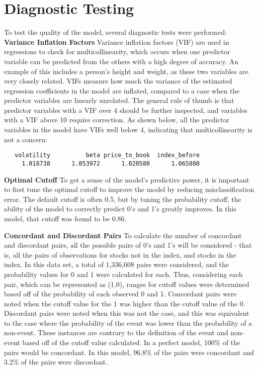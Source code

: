 \documentclass[12pt,twoside]{reedthesis}
\theoremstyle{definition}
\theoremstyle{definition}
\theoremstyle{definition}
\theoremstyle{remark}
\begin{document}
\section{Diagnostic Testing}\label{diagnostic-testing}

To test the quality of the model, several diagnostic tests were
performed: \hfill\break
\textbf{Variance Inflation Factors} \hfill\break
Variance inflation factors (VIF) are used in regressions to check for
multicollinearity, which occurs when one predictor variable can be
predicted from the others with a high degree of accuracy. An example of
this includes a person's height and weight, as these two variables are
very closely related. VIFs measure how much the variance of the
estimated regression coefficients in the model are inflated, compared to
a case when the predictor variables are linearly unrelated. The general
rule of thumb is that predictor variables with a VIF over 4 should be
further inspected, and variables with a VIF above 10 require correction.
As shown below, all the predictor variables in the model have VIFs well
below 4, indicating that multicollinearity is not a concern:
\begin{verbatim}
   volatility          beta price_to_book  index_before 
     1.018738      1.053972      1.020580      1.065880 
\end{verbatim}
\hfill\break
\textbf{Optimal Cutoff} \hfill\break
To get a sense of the model's predictive power, it is important to first
tune the optimal cutoff to improve the model by reducing
misclassification error. The default cutoff is often 0.5, but by tuning
the probability cutoff, the ability of the model to correctly predict
0's and 1's greatly improves. In this model, that cutoff was found to be
0.86.

\hfill\break
\textbf{Concordant and Discordant Pairs} \hfill\break
To calculate the number of concordant and discordant pairs, all the
possible pairs of 0's and 1's will be considered - that is, all the
pairs of observations for stocks not in the index, and stocks in the
index. In this data set, a total of 1,336,608 pairs were considered, and
the probability values for 0 and 1 were calculated for each. Thus,
considering each pair, which can be represented as (1,0), ranges for
cutoff values were determined based off of the probability of each
observed 0 and 1. Concordant pairs were noted when the cutoff value for
the 1 was higher than the cutoff value of the 0. Discordant pairs were
noted when this was not the case, and this was equivalent to the case
where the probability of the event was lower than the probability of a
non-event. These instances are contrary to the definition of the event
and non-event based off of the cutoff value calculated. In a perfect
model, 100\% of the pairs would be concordant. In this model, 96.8\% of
the pairs were concordant and 3.2\% of the pairs were discordant.
\end{document}
